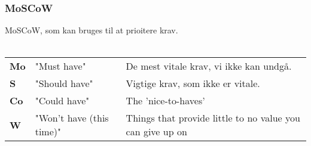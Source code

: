 \subsubsection{MoSCoW}
MoSCoW, som kan bruges til at prioitere krav. \\\\
\begin{tabular}{lll}
    \textbf{Mo} &   
    "Must have"                 &
    De mest vitale krav, vi ikke kan undgå. \\

    \textbf{S}  &   
    "Should have"               & 
    Vigtige krav, som ikke er vitale. \\

    \textbf{Co} &   
    "Could have"                & 
    The 'nice-to-haves' \\

    \textbf{W}  &   
    "Won’t have (this time)"    & 
    Things that provide little to no value you can give up on \\
    
\end{tabular}
\\